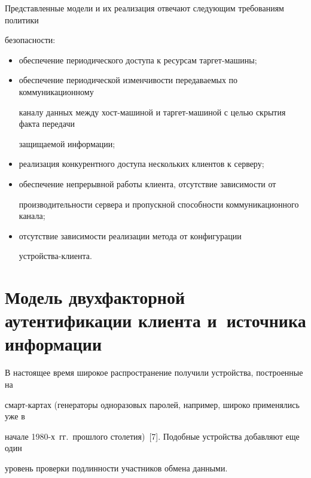     Представленные модели и их реализация отвечают следующим требованиям политики 


безопасности:


    \begin{itemize}


\item обеспечение периодического доступа к ресурсам таргет-машины;\\[-14pt]


\item обеспечение периодической изменчивости передаваемых по коммуникационному 


каналу данных между хост-ма\-ши\-ной и таргет-машиной с целью скрытия факта передачи 


защищаемой информации;\\[-14pt]


\item реализация конкурентного доступа нескольких клиентов к серверу;\\[-14pt]


\item обеспечение непрерывной работы клиента, отсутствие зависимости от 


производительности сервера и пропускной способности коммуникационного ка\-нала;\\[-14pt]


\item отсутствие зависимости реализации метода от конфигурации 


устрой\-ст\-ва-кли\-ента.


\end{itemize}





\section{Модель двухфакторной аутентификации клиента и~источника информации}


    


    В настоящее время широкое распространение получили устройства, построенные на 


смарт-кар\-тах (генераторы одноразовых паролей, например, широко применялись уже в 


начале 1980-х~гг.\ прошлого столетия)~[7]. Подобные устройства добавляют еще один 


уровень проверки подлинности участников обмена данными.



